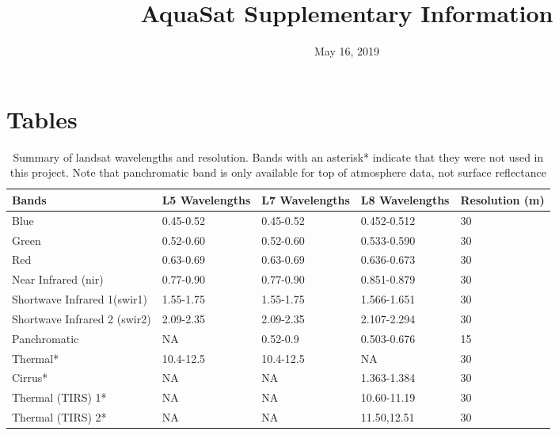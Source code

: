 \documentclass[]{article}
\title{AquaSat Supplementary Information}
\author{}
\date{May 16, 2019}
\begin{document}
\maketitle

\hypertarget{tables}{%
\section{Tables}\label{tables}}

\begin{table}[t]

\caption{\label{tab:landsat}Summary of landsat wavelengths and resolution. Bands with an asterisk* indicate that they were not used in this project. Note that panchromatic 
        band is only available for top of atmosphere data, not surface reflectance}
\centering
\begin{tabu} to 
\hline
\textbf{Bands} & \textbf{L5 Wavelengths} & \textbf{L7 Wavelengths} & \textbf{L8 Wavelengths} & \textbf{Resolution (m)}\\
\hline
Blue & 0.45-0.52 & 0.45-0.52 & 0.452-0.512 & 30\\
\hline
Green & 0.52-0.60 & 0.52-0.60 & 0.533-0.590 & 30\\
\hline
Red & 0.63-0.69 & 0.63-0.69 & 0.636-0.673 & 30\\
\hline
Near Infrared (nir) & 0.77-0.90 & 0.77-0.90 & 0.851-0.879 & 30\\
\hline
Shortwave Infrared 1(swir1) & 1.55-1.75 & 1.55-1.75 & 1.566-1.651 & 30\\
\hline
Shortwave Infrared 2 (swir2) & 2.09-2.35 & 2.09-2.35 & 2.107-2.294 & 30\\
\hline
Panchromatic & NA & 0.52-0.9 & 0.503-0.676 & 15\\
\hline
Thermal* & 10.4-12.5 & 10.4-12.5 & NA & 30\\
\hline
Cirrus* & NA & NA & 1.363-1.384 & 30\\
\hline
Thermal (TIRS) 1* & NA & NA & 10.60-11.19 & 30\\
\hline
Thermal (TIRS) 2* & NA & NA & 11.50,12.51 & 30\\
\hline
\end{tabu}
\end{table}
\end{document}
